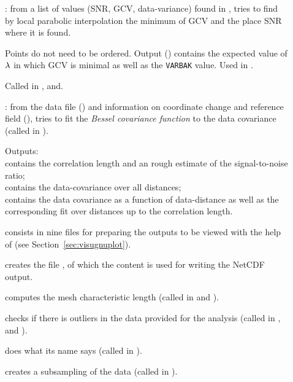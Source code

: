\begin{description}
\item[]: from a list of values (SNR, GCV, data-variance) found in , tries 
to find by local parabolic interpolation the minimum of GCV and the place SNR where it is found.

Points do not need to be ordered. Output () contains the 
expected value of $\lambda$ in which GCV is minimal as well as the \texttt{VARBAK} 
value. Used in .

Called in , and.


\item[]: from the data file () and information on coordinate change and 
reference field (), tries to fit the \textit{Bessel covariance function} to the data covariance (called in ).

Outputs:\\
 contains the correlation length and an rough estimate of the signal-to-noise ratio;\\
 contains the data-covariance over all distances;\\ 
 contains the data covariance as a function of data-distance as well as the corresponding fit over distances up to the correlation length.

\item[] consists in nine files for preparing the outputs to be viewed with the help of \gnuplot (see Section~\ref{sec:visugnuplot}). 

\item[] creates the file , of which the content is used for writing the NetCDF output.

\item[] computes the mesh characteristic length (called in  and ).

\item[] checks if there is outliers in the data provided for the analysis (called in ,  and ).

\item[] does what its name says (called in ).

\item[] creates a subsampling of the data (called in ).


\end{description}
